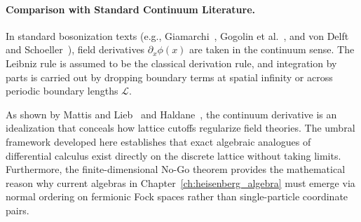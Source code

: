 \paragraph{Comparison with Standard Continuum Literature.}
In standard bosonization texts (e.g., Giamarchi~\cite{giamarchi2004}, Gogolin et al.~\cite{gogolin1998}, and von Delft and Schoeller~\cite{vondelft1998}), field derivatives $\partial_x \phi(x)$ are taken in the continuum sense. The Leibniz rule is assumed to be the classical derivation rule, and integration by parts is carried out by dropping boundary terms at spatial infinity or across periodic boundary lengths $\mathcal{L}$.

As shown by Mattis and Lieb~\cite{mattis1965} and Haldane~\cite{haldane1981}, the continuum derivative is an idealization that conceals how lattice cutoffs regularize field theories. The umbral framework developed here establishes that exact algebraic analogues of differential calculus exist directly on the discrete lattice without taking limits. Furthermore, the finite-dimensional No-Go theorem provides the mathematical reason why current algebras in Chapter~\ref{ch:heisenberg_algebra} must emerge via normal ordering on fermionic Fock spaces rather than single-particle coordinate pairs.

